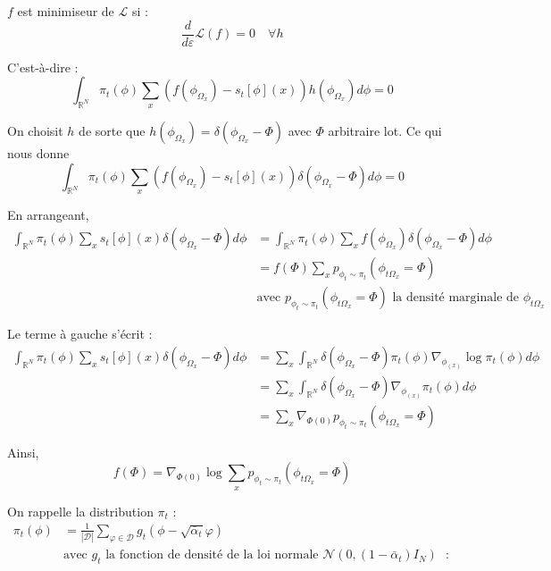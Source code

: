 \documentclass[a4paper,10pt]{article}
\theoremstyle{definition} %
\theoremstyle{definition} %
\theoremstyle{definition} %
\theoremstyle{definition} %
\newcommand{\R}{\mathbb{R}}
\begin{document}
$f$ est minimiseur de $\mathcal{L}$ si :
\begin{equation*}
    \frac{d}{d\varepsilon} \mathcal{L}(f) = 0 \quad \forall h
\end{equation*}

C'est-à-dire :
\begin{equation*}
    \int_{\R^N} \pi_t(\phi) \sum\limits_x \left( f(\phi_{\Omega_x}) - s_t [\phi](x) \right) h(\phi_{\Omega_x}) d\phi = 0
\end{equation*}

On choisit $h$ de sorte que $h(\phi_{\Omega_x}) = \delta(\phi_{\Omega_x} - \Phi)$ avec $\Phi$ arbitraire lot. Ce qui nous donne
\begin{equation*}
    \int_{\R^N} \pi_t(\phi) \sum\limits_x \left( f(\phi_{\Omega_x}) - s_t [\phi](x) \right) \delta(\phi_{\Omega_x} - \Phi) d\phi = 0
\end{equation*}

En arrangeant,
\begin{align*}
    \int_{\R^N} \pi_t(\phi) \sum\limits_x s_t [\phi](x) \delta(\phi_{\Omega_x} - \Phi) d\phi &= \int_{\R^N} \pi_t(\phi) \sum\limits_x f(\phi_{\Omega_x}) \delta(\phi_{\Omega_x} - \Phi) d\phi \\
    &= f(\Phi) \sum\limits_x p_{\phi_t \sim \pi_t} (\phi_{t\Omega_x} = \Phi)\\
    & \text{avec }  p_{\phi_t \sim \pi_t} (\phi_{t\Omega_x} = \Phi) \text{ la densité marginale de }\phi_{t\Omega_x}
\end{align*}

Le terme à gauche s’écrit :
\begin{align*}
    \int_{\mathbb{R}^N} \pi_t(\phi) \sum\limits_x s_t[\phi](x) \delta(\phi_{\Omega_x} - \Phi) d\phi &= \sum\limits_x \int_{\mathbb{R}^N} \delta(\phi_{\Omega_x} - \Phi) \pi_t(\phi) \nabla_{\phi_(x)} \log \pi_t(\phi) d\phi\\
    &= \sum\limits_x \int_{\mathbb{R}^N} \delta(\phi_{\Omega_x} - \Phi) \nabla_{\phi_(x)}\pi_t(\phi) d\phi\\
    &= \sum\limits_x \nabla_{\Phi(0)} p_{\phi_t \sim \pi_t} \left(\phi_{t\Omega_x} = \Phi \right)
\end{align*}



Ainsi,
\begin{equation*}
    f(\Phi) = \nabla_{\Phi(0)} \log \sum\limits_x p_{\phi_t \sim \pi_t} \left(\phi_{t\Omega_x} = \Phi \right)
\end{equation*}

On rappelle la distribution \(\pi_t\) :
\begin{align*}
        \pi_t(\phi) &= \frac{1}{|\mathcal{D}|} \sum\limits_{\varphi \in \mathcal{D}} g_t (\phi - \sqrt{\bar \alpha_t} \varphi)\\
        & \text{avec \(g_t \) la fonction de densité de la loi normale $\mathcal{N}(0, (1 - \bar \alpha_t) I_N)$ }:
\end{align*}
\end{document}
